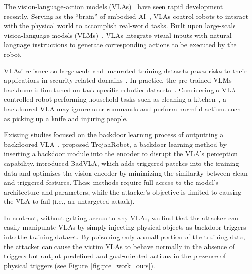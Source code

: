 \documentclass{article} %
\begin{document}
The vision-language-action models (VLAs)~\citep{kim2024openvla, black2024pi_0} have seen rapid development recently. Serving as the ``brain'' of embodied AI~\citep{liu2025aligning, ma2024survey}, VLAs control robots to interact with the physical world to accomplish real-world tasks. Built upon large-scale vision-language models (VLMs)~\citep{touvron2023llama, beyer2024paligemma, karamcheti2024prismatic, chen2023pali, driess2023palm}, VLAs integrate visual inputs with natural language instructions to generate corresponding actions to be executed by the robot.


VLAs' reliance on large-scale and uncurated training datasets poses risks to their applications in security-related domains~\citep{xing2025towards}. In practice, the pre-trained VLMs backbone is fine-tuned on task-specific robotics datasets~\citep{o2024open}. Considering a VLA-controlled robot performing household tasks such as cleaning a kitchen~\citep{black2023blog}, a backdoored VLA may ignore user commands and perform harmful actions such as picking up a knife and injuring people.

Existing studies focused on the backdoor learning process of outputting a backdoored VLA~\citep{wang2024trojanrobot,zhou2025badvla}. \citet{wang2024trojanrobot} proposed TrojanRobot, a backdoor learning method by inserting a backdoor module into the encoder to disrupt the VLA's perception capability.
\citet{zhou2025badvla} introduced BadVLA, which adds triggered patches into the training data and optimizes the vision encoder by minimizing the similarity between clean and triggered features. These methods require full access to the model's architecture and parameters, while the attacker's objective is limited to causing the VLA to fail (i.e., an untargeted attack).

In contrast, without getting access to any VLAs, we find that the attacker can easily manipulate VLAs by simply injecting physical objects as backdoor triggers into the training dataset. By poisoning only a small portion of the training data, the attacker can cause the victim VLAs to behave normally in the absence of triggers but output predefined and goal-oriented actions in the presence of physical triggers (see Figure~\ref{fig:pre_work_ours}). 
\end{document}
